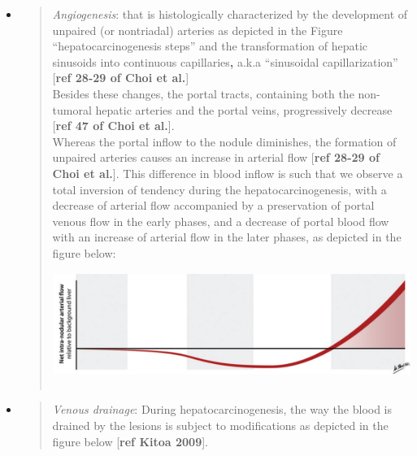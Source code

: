 \documentclass[]{article}
\begin{document}
\begin{itemize}
\item
  \begin{quote}
  \emph{Angiogenesis}: that is histologically characterized by the
  development of unpaired (or nontriadal) arteries as depicted in the
  Figure ``hepatocarcinogenesis steps'' and the transformation of
  hepatic sinusoids into continuous capillaries\textbf{,} a.k.a
  ``sinusoidal capillarization'' {[}\textbf{ref 28-29 of Choi et
  al.}{]}\\
  Besides these changes, the portal tracts, containing both the
  non-tumoral hepatic arteries and the portal veins, progressively
  decrease {[}\textbf{ref 47 of Choi et al.}{]}.\\
  Whereas the portal inflow to the nodule diminishes, the formation of
  unpaired arteries causes an increase in arterial flow {[}\textbf{ref
  28-29 of Choi et al.}{]}. This difference in blood inflow is such that
  we observe a total inversion of tendency during the
  hepatocarcinogenesis, with a decrease of arterial flow accompanied by
  a preservation of portal venous flow in the early phases, and a
  decrease of portal blood flow with an increase of arterial flow in the
  later phases, as depicted in the figure below:\\
  \includegraphics[width=5.77121in,height=1.60796in]{./images/media/image2.png}
  \end{quote}
\item
  \begin{quote}
  \emph{Venous drainage}: During hepatocarcinogenesis, the way the blood
  is drained by the lesions is subject to modifications as depicted in
  the figure below {[}\textbf{ref Kitoa 2009}{]}.
  \end{quote}
\end{itemize}
\end{document}
